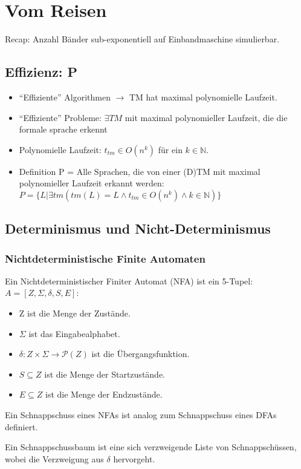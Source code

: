 \chapter{Vom Reisen}
Recap: Anzahl Bänder sub-exponentiell auf Einbandmaschine simulierbar.
\section{Effizienz: P}
\begin{itemize}
    \item ``Effiziente'' Algorithmen $\rightarrow$ TM hat maximal polynomielle Laufzeit.
    \item ``Effiziente'' Probleme: $\exists TM$ mit maximal polynomieller Laufzeit,
        die die formale sprache erkennt 
    \item Polynomielle Laufzeit: $t_{tm} \in O(n^k)$ für ein $k \in \mathbb{N}$.
    \item Definition P = Alle Sprachen,
        die von einer (D)TM mit maximal polynomieller Laufzeit erkannt werden:
        $P = \{L| \exists tm (tm(L) = L \wedge t_{tm} \in O(n^k) \wedge k \in \mathbb{N})\}$
\end{itemize}
\section{Determinismus und Nicht-Determinismus}
\subsection{Nichtdeterministische Finite Automaten}
Ein Nichtdeterministischer Finiter Automat (NFA) ist ein 5-Tupel:
$A = [Z, \Sigma, \delta, S, E]$:
\begin{itemize}
    \item Z ist die Menge der Zustände.
    \item $\Sigma$ ist das Eingabealphabet.
    \item $\delta: Z \times \Sigma \rightarrow \mathcal{P}(Z)$ ist die Übergangsfunktion.
    \item $S \subseteq Z$ ist die Menge der Startzustände.
    \item $E \subseteq Z$ ist die Menge der Endzustände.
\end{itemize}

Ein Schnappschuss eines NFAs ist analog zum Schnappschuss eines DFAs definiert.

Ein Schnappschussbaum ist eine sich verzweigende Liste von Schnappschüssen,
wobei die Verzweigung aus $\delta$ hervorgeht.

